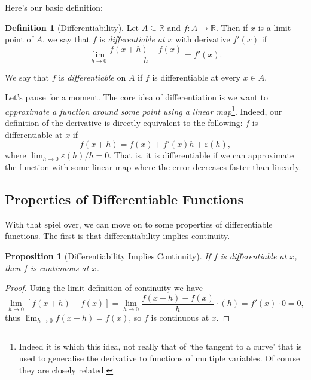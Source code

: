 \documentclass[11pt, a4paper]{article}
\newtheorem{proposition}[theorem]{Proposition}
\theoremstyle{definition}
\newtheorem{definition}[theorem]{Definition}
\newtheorem*{remark}{Remark}
\newcommand{\vocab}[1]{\emph{#1}} %
\newcommand{\R}{\mathbb{R}}
\begin{document}
Here's our basic definition:

\begin{definition}[Differentiability]
	Let $A \subseteq \R$ and $f: A \rightarrow \R$. 
	Then if $x$ is a limit point of $A$, we say that $f$ is \vocab{differentiable at $x$} with derivative $f'(x)$ if
	$$
	\lim_{h \to 0} \frac{f(x + h) - f(x)}{h} = f'(x).
	$$

	We say that $f$ is \vocab{differentiable} on $A$ if $f$ is differentiable at every $x \in A$.
\end{definition}

Let's pause for a moment. The core idea of differentiation is 
we want to \emph{approximate a function around some point using a linear map}\footnote{Indeed it is which this idea, not really that of `the tangent to a curve' that is used to generalise the derivative to functions of multiple variables. Of course they are closely related.}. Indeed, our definition of the derivative is directly equivalent to the following: $f$ is differentiable at $x$ if
$$
	f(x + h) = f(x) + f'(x)h + \varepsilon(h),
$$
where $\lim_{h\to 0} \varepsilon(h)/h = 0$. That is, it is differentiable if we can approximate the function with some linear map where the error decreases faster than linearly.



\subsection{Properties of Differentiable Functions}

With that spiel over, we can move on to some properties of differentiable functions. The first is that differentiability implies continuity.

\begin{proposition}[Differentiability Implies Continuity]
	If $f$ is differentiable at $x$, then $f$ is continuous at $x$.
\end{proposition}
\begin{proof}
	Using the limit definition of continuity we have
	$$\lim_{h \to 0} \left[f(x + h) - f(x)\right] = \lim_{h \to 0} \frac{f(x + h) - f(x)}{h} \cdot (h) = f'(x) \cdot 0 = 0,
	$$
	thus $\lim_{h \to 0} f(x + h) = f(x)$, so $f$ is continuous at $x$.
\end{proof}
\end{document}
